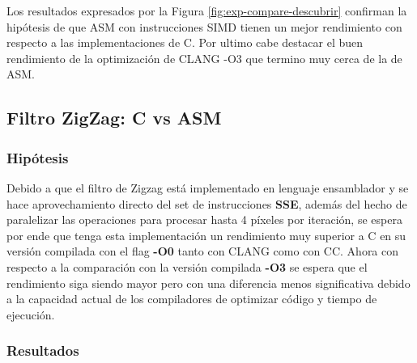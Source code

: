 \documentclass[a4paper]{article}
\begin{document}
Los resultados expresados por la Figura \ref{fig:exp-compare-descubrir} confirman la hipótesis de que ASM con instrucciones SIMD tienen un mejor rendimiento con respecto a las implementaciones de C. Por ultimo cabe destacar el buen rendimiento de la optimización de CLANG -O3 que termino muy cerca de la de ASM.

\newpage
\subsection{Filtro ZigZag: C vs ASM}

\subsubsection{Hipótesis}

Debido a que el filtro de Zigzag está implementado en lenguaje ensamblador y se hace aprovechamiento directo del set de instrucciones \textbf{SSE}, además del hecho de paralelizar las operaciones para procesar hasta 4 píxeles por iteración, se espera por ende que tenga esta implementación un rendimiento muy superior a C en su versión compilada con el flag \textbf{-O0} tanto con CLANG como con CC. Ahora con respecto a la comparación con la versión compilada \textbf{-O3} se espera que el rendimiento siga siendo mayor pero con una diferencia menos significativa debido a la capacidad actual de los compiladores de optimizar código y tiempo de ejecución. 

\subsubsection{Resultados}
\end{document}
